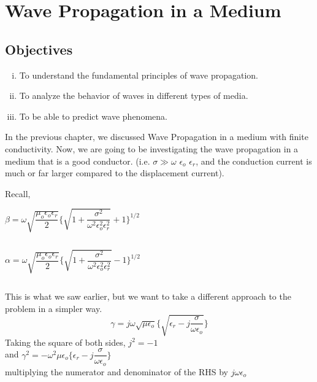 \chapter{Wave Propagation in a Medium}\label{lec:lec26}
\begin{mdframed}[backgroundcolor=lightblue, linewidth=1pt,  hidealllines=true]
\section{Objectives}
\begin{enumerate}[(i)]
	\item To understand the fundamental principles of wave propagation.
	\item To analyze the behavior of waves in different types of media.
	\item To be able to predict wave phenomena.
\end{enumerate}
\end{mdframed}
In the previous chapter, we discussed Wave Propagation in a medium with finite conductivity. Now, we are going to be investigating the wave propagation in a medium that is a good conductor. (i.e. $\sigma \gg \omega$ $\epsilon_{o}$ $\epsilon_{r}$, and the conduction current is much or far larger compared to the displacement current).

Recall,
\begin{center}
$\beta=\omega\sqrt{\dfrac{\mu_{o}\epsilon_{o}\epsilon_{r}}{2}}\Bigg\{{\sqrt{1+\dfrac{\sigma^{2}}{\omega^{2}\epsilon_{o}^{2}\epsilon_{r}^{2}}}+1 }\Bigg\}^{1/2}$
\end{center}
\begin{equation}\end{equation}

\begin{center}
$\alpha=\omega\sqrt{\dfrac{\mu_{o}\epsilon_{o}\epsilon_{r}}{2}}\Bigg\{\sqrt{1+\dfrac{\sigma^{2}}{\omega^{2}\epsilon_{o}^{2}\epsilon_{r}^{2}}}  -1\Bigg\}^{1/2}$	
\end{center}
\begin{equation}\end{equation}

This is what we saw earlier, but we want to take a different approach to the problem in a simpler way.
\begin{equation}
\gamma=j\omega\sqrt{\mu\epsilon_{o}}\Bigg\{\sqrt{\epsilon_{r}-j\dfrac{\sigma}{\omega\epsilon_{o}}}\Bigg\}
\end{equation}		
Taking the square of both sides,
$j^{2}= -1$\\ 
and $\gamma^{2}=-\omega^{2}\mu\epsilon_{o}\Bigg\{\epsilon_{r}-j\dfrac{\sigma}{\omega\epsilon_{o}}\Bigg\}$\\
\begin{equation}\end{equation}
multiplying the numerator and denominator of the RHS  by $j\omega\epsilon_{o}$

